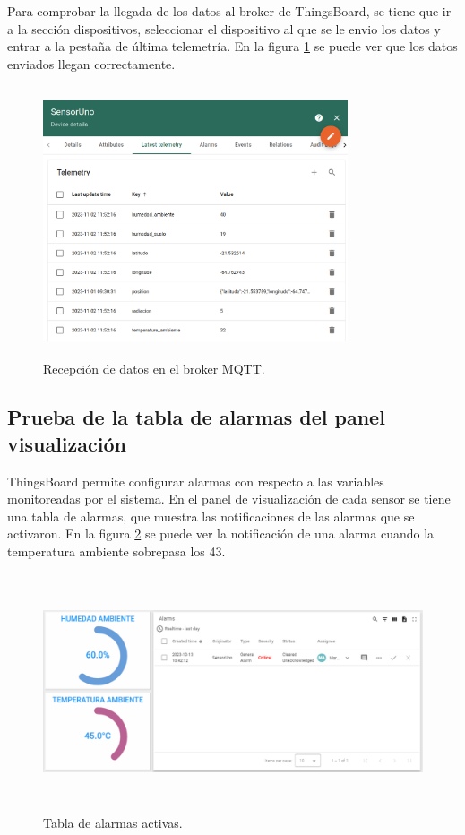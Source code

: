 Para comprobar la llegada de los datos al broker de ThingsBoard, se tiene que ir a la sección dispositivos, seleccionar el dispositivo al que se le envio los datos y entrar a la pestaña de última telemetría. En la figura \ref{fig:tb recepcion} se puede ver que los datos enviados llegan correctamente.

\begin{figure}[h!]
  \centering
    \includegraphics[width=9cm, height=8cm]{./Figures/tb_recepcion2.png}
  \caption{Recepción de datos en el broker MQTT.}
    \label{fig:tb recepcion}
\end{figure}

\subsection{Prueba de la tabla de alarmas del panel visualización}
ThingsBoard permite configurar alarmas con respecto a las variables monitoreadas por el sistema. En el panel de visualización de cada sensor se tiene una tabla de alarmas, que muestra las notificaciones de las alarmas que se activaron.
En la figura \ref{fig:alarmas tb} se puede ver la notificación de una alarma cuando la temperatura ambiente sobrepasa los 43\textcelsius.

\begin{figure}[h!]
  \centering
    \includegraphics[width=\linewidth, height=7cm]{./Figures/alarmas_tb.png}
  \caption{Tabla de alarmas activas.}
    \label{fig:alarmas tb}
\end{figure}

